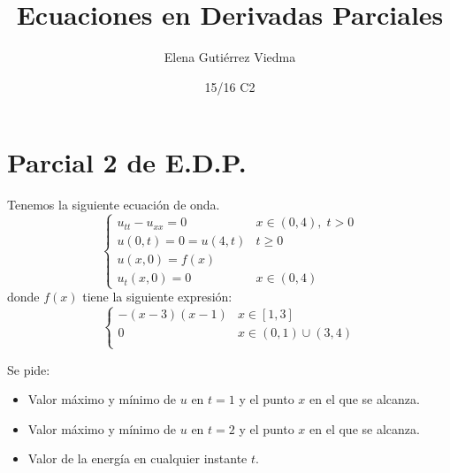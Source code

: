 \documentclass[bibnumbers, palatino]{apuntes}
\title{Ecuaciones en Derivadas Parciales}
\author{Elena Gutiérrez Viedma}
\date{15/16 C2}
\begin{document}
\pagestyle{plain}

\section{Parcial 2 de E.D.P.}

\begin{problem} Tenemos la siguiente ecuación de onda. \[ \begin{cases}
u_{tt} - u_{xx} = 0	& x \in (0,4),\; t > 0 \\
u(0,t) = 0 = u(4,t) & t ≥ 0 \\
u(x,0) = f(x)\\
u_t(x,0) = 0 	& x \in (0,4)
\end{cases} \]
donde $f(x)$ tiene la siguiente expresión:
\[ \begin{cases}
-(x-3)(x-1)	& x \in [1,3]\\
0 & x \in (0,1)\cup(3,4)\\
\end{cases} \]

Se pide:
\begin{itemize}
\item Valor máximo y mínimo de $u$ en $t=1$ y el punto $x$ en el que se alcanza.
\item Valor máximo y mínimo de $u$ en $t=2$ y el punto $x$ en el que se alcanza.
\item Valor de la energía en cualquier instante $t$.
\end{itemize}
\end{problem}
\end{document}
